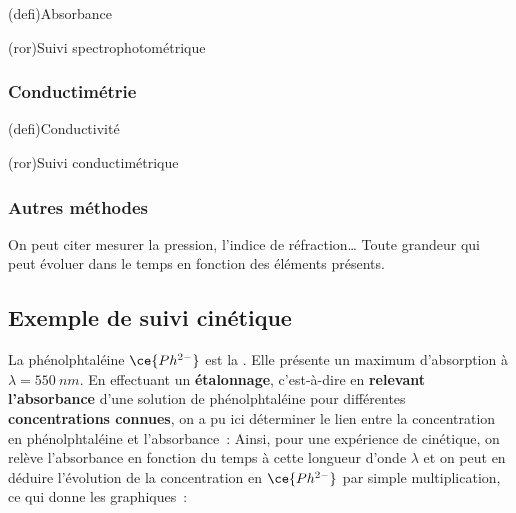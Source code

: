 \documentclass[../../main/main.tex]{subfiles}
\begin{document}
\begin{tcb}(defi){Absorbance}
\end{tcb}

\begin{tcb}[label=prop:spectro, halign=center](ror){Suivi spectrophotométrique}
\end{tcb}

\subsubsection{Conductimétrie}

\begin{tcb}(defi){Conductivité}
\end{tcb}

\begin{tcb}[label=prop:conducto, halign=center](ror){Suivi conductimétrique}
\end{tcb}

\subsubsection{Autres méthodes}
On peut citer mesurer la pression, l'indice de réfraction… Toute grandeur qui
peut évoluer dans le temps en fonction des éléments présents.

\subsection{Exemple de suivi cinétique}

La phénolphtaléine $\ce{Ph^{2-}}$ est la . Elle présente
un maximum d'absorption à $\lambda = \SI{550}{nm}$. En effectuant un \textbf{étalonnage},
c'est-à-dire en \textbf{relevant l'absorbance} d'une solution de phénolphtaléine pour
différentes \textbf{concentrations connues}, on a pu ici déterminer le lien
entre la concentration en phénolphtaléine et l'absorbance~:
\psw{%
	\[
		[\ce{Ph^{2-}}] = \frac{100}{\num{1.45}}A
		\quad
		\left( \si{\micro mol.L^{-1}} \right)
	\]
}
Ainsi, pour une expérience de cinétique, on relève l'absorbance en
fonction du temps à cette longueur d'onde $\lambda$ et on peut en déduire
l'évolution de la concentration en $\ce{Ph^{2-}}$ par simple multiplication,
ce qui donne les graphiques~:
\end{document}
